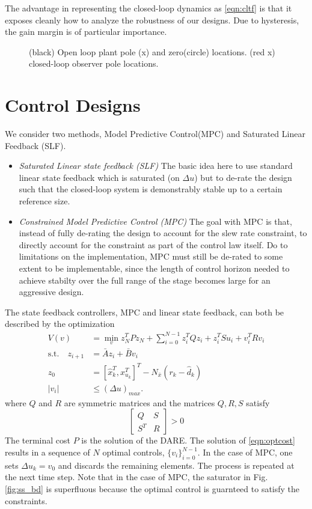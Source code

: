 \documentclass[journal,twocolumn,twoside]{IEEEtran}
\newcommand{\Ad}{\ensuremath{\bar A }\xspace}
\newcommand{\Bd}{\ensuremath{\bar B }\xspace}
\begin{document}
The advantage in representing the closed-loop dynamics as \eqref{eqn:cltf} is that it exposes cleanly how to analyze the robustness of our designs. Due to hysteresis, the gain margin is of particular importance. 


\begin{figure}
  
  \caption{(black) Open loop plant pole (x) and zero(circle) locations. (red x) closed-loop observer pole locations.}
  \label{fig:obs_cl}
\end{figure}


\section{Control Designs}
We consider two methods, Model Predictive Control(MPC) and Saturated Linear Feedback (SLF).
\begin{itemize}
\item\emph{Saturated Linear state feedback (SLF)} The basic idea here to use standard linear state feedback which is saturated (on $\Delta u$) but to de-rate the design such that the closed-loop system is demonstrably stable up to a certain reference size. 
\item\emph{Constrained Model Predictive Control (MPC)} The goal with MPC is that, instead of fully de-rating the design to account for the slew rate constraint, to directly account for the constraint as part of the control law itself. Do to limitations on the implementation, MPC must still be de-rated to some extent to be implementable, since the length of control horizon needed to achieve stabilty over the full range of the stage becomes large for an aggressive design.
\end{itemize}

The state feedback controllers, MPC and linear state feedback, can both be described by the optimization
\begin{align}
V(v) &= \min_{v} z^T_{N}Pz_{N} + \sum_{i=0}^{N-1}z_{i}^{T}Qz_{i} + z^T_iSu_i + v^{T}_{i}Rv_{i} \label{eqn:optcost}\\
 \text{s.t.} \quad z_{i+1} &= \Ad z_{i} + \Bd v_{i}\\
z_{0} &= [\hat{x}^T_{k}, x^T_{u_k}]^T - N_{\bar{x}}(r_k-\hat{d}_k)\\
|v_i | & \leq (\Delta u)_{max}.\label{eqn:cntrl_constraint}
\end{align}
where $Q$ and $R$ are symmetric matrices and the matrices $Q,R,S$ satisfy
\begin{equation}
  \begin{bmatrix}
    Q & S\\S^T &R
  \end{bmatrix} > 0
\end{equation}
The terminal cost $P$ is the solution of the DARE. The solution of \eqref{eqn:optcost} results in a sequence of $N$ optimal controls, $\{v_i\}_{i=0}^{N-1}$. In the case of MPC, one sets $\Delta u_k = v_0$ and discards the remaining elements. The process is repeated at the next time step. Note that in the case of MPC, the saturator in Fig. \ref{fig:ss_bd} is superfluous because the optimal control is guarnteed to satisfy the constraints.
\end{document}
